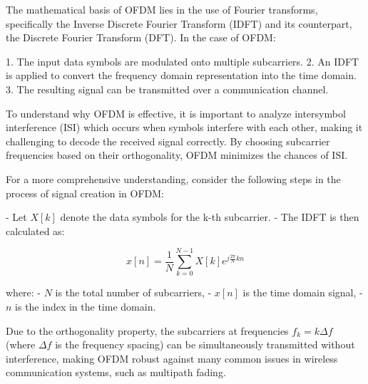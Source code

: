 The mathematical basis of OFDM lies in the use of Fourier transforms, specifically the Inverse Discrete Fourier Transform (IDFT) and its counterpart, the Discrete Fourier Transform (DFT). In the case of OFDM:

1. The input data symbols are modulated onto multiple subcarriers.
2. An IDFT is applied to convert the frequency domain representation into the time domain.
3. The resulting signal can be transmitted over a communication channel.

To understand why OFDM is effective, it is important to analyze intersymbol interference (ISI) which occurs when symbols interfere with each other, making it challenging to decode the received signal correctly. By choosing subcarrier frequencies based on their orthogonality, OFDM minimizes the chances of ISI.

For a more comprehensive understanding, consider the following steps in the process of signal creation in OFDM:

- Let $X[k]$ denote the data symbols for the k-th subcarrier.
- The IDFT is then calculated as:

$$ x[n] = \frac{1}{N} \sum_{k=0}^{N-1} X[k] e^{j \frac{2 \pi}{N} k n} $$

where:
- $N$ is the total number of subcarriers,
- $x[n]$ is the time domain signal,
- $n$ is the index in the time domain.

Due to the orthogonality property, the subcarriers at frequencies $f_k = k\Delta f$ (where $\Delta f$ is the frequency spacing) can be simultaneously transmitted without interference, making OFDM robust against many common issues in wireless communication systems, such as multipath fading.

